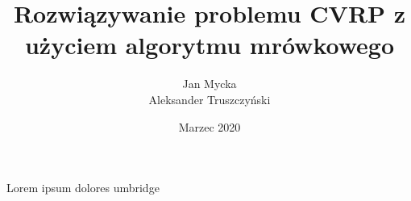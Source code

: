 \documentclass[a4paper,11pt,twoside, fleqn]{report}
\title{Rozwiązywanie problemu CVRP z użyciem algorytmu mrówkowego}
\author{Jan Mycka \\ Aleksander Truszczyński}
\date{Marzec 2020}
\begin{document}
	Lorem ipsum dolores umbridge
\end{document}
